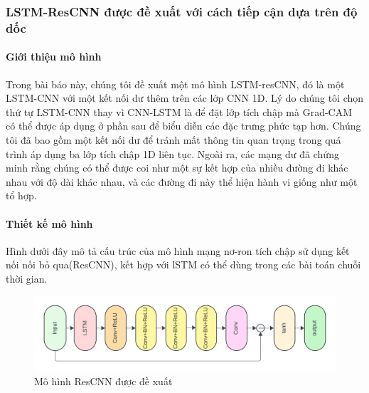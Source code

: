 \documentclass[conference]{IEEEtran}
\begin{document}
\subsubsection{LSTM-ResCNN được đề xuất với cách tiếp cận dựa trên độ dốc}
\paragraph{Giới thiệu mô hình}
Trong bài báo này, chúng tôi đề xuất một mô hình LSTM-resCNN, đó là một LSTM-CNN với một kết nối dư thêm trên các lớp CNN 1D. Lý do chúng tôi chọn thứ tự LSTM-CNN thay vì CNN-LSTM là để đặt lớp tích chập mà Grad-CAM có thể được áp dụng ở phần sau để biểu diễn các đặc trưng phức tạp hơn. Chúng tôi đã bao gồm một kết nối dư để tránh mất thông tin quan trọng trong quá trình áp dụng ba lớp tích chập 1D liên tục. Ngoài ra, các mạng dư đã chứng minh rằng chúng có thể được coi như một sự kết hợp của nhiều đường đi khác nhau với độ dài khác nhau, và các đường đi này thể hiện hành vi giống như một tổ hợp.
\paragraph{Thiết kế mô hình}
Hình dưới đây mô tả cấu trúc của mô hình mạng nơ-ron tích chập sử dụng kết nối nối bỏ qua(ResCNN), kết hợp với lSTM có thể dùng trong các bài toán chuỗi thời gian.
\begin{figure}[H]
    \centering
    \begin{minipage}{0.23\textwidth}
        \centering
        \includegraphics[width=1\textwidth]{bibliography/figure/ResCNN/ResCNN_1.png}
        \caption{Mô hình ResCNN được đề xuất}
        \label{fig:gru_del_up}
    \end{minipage}

\end{figure}
\end{document}
